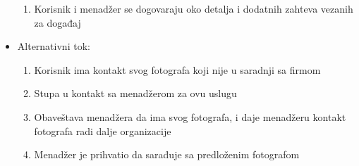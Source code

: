 \documentclass[a4paper]{article}
\begin{document}
\begin{itemize}
\begin{enumerate}
            \item Korisnik i menadžer se dogovaraju oko detalja i dodatnih zahteva vezanih za događaj
        \end{enumerate}
    \item Alternativni tok:
        \begin{enumerate}
            \item Korisnik ima kontakt svog fotografa koji nije u saradnji sa firmom
            \item Stupa u kontakt sa menadžerom za ovu uslugu
            \item Obaveštava menadžera da ima svog fotografa, i daje menadžeru kontakt fotografa radi dalje organizacije
            \item Menadžer je prihvatio da sarađuje sa predloženim fotografom
        \end{enumerate}
\end{itemize}
\end{document}
